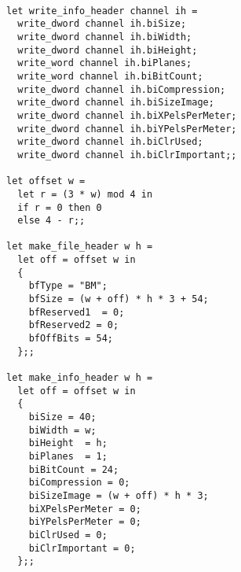 \documentclass[a4paper,10pt]{report}
\theoremstyle{break}
\begin{document}
\newpage
    \begin{lstlisting}
  
let write_info_header channel ih =
  write_dword channel ih.biSize;
  write_dword channel ih.biWidth;
  write_dword channel ih.biHeight;
  write_word channel ih.biPlanes;
  write_word channel ih.biBitCount;
  write_dword channel ih.biCompression;
  write_dword channel ih.biSizeImage;
  write_dword channel ih.biXPelsPerMeter;
  write_dword channel ih.biYPelsPerMeter;
  write_dword channel ih.biClrUsed;
  write_dword channel ih.biClrImportant;;

let offset w =
  let r = (3 * w) mod 4 in
  if r = 0 then 0
  else 4 - r;;

let make_file_header w h = 
  let off = offset w in
  {
    bfType = "BM";
    bfSize = (w + off) * h * 3 + 54;
    bfReserved1  = 0;
    bfReserved2 = 0;
    bfOffBits = 54;
  };;
  
let make_info_header w h = 
  let off = offset w in
  {
    biSize = 40;
    biWidth = w;
    biHeight  = h;
    biPlanes  = 1;
    biBitCount = 24;
    biCompression = 0;
    biSizeImage = (w + off) * h * 3;
    biXPelsPerMeter = 0;
    biYPelsPerMeter = 0;
    biClrUsed = 0;
    biClrImportant = 0;
  };;
    \end{lstlisting}
\end{document}
